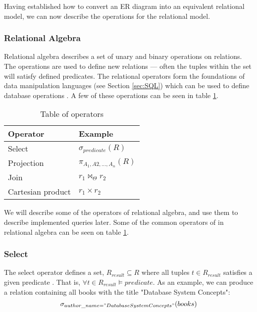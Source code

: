
Having established how to convert an ER diagram into an equivalent relational model, we can now describe the operations for the relational model.

\subsubsection{Relational Algebra}\label{sec:relationalAlgebra}
Relational algebra describes a set of unary and binary operations on relations.
The operations are used to define new relations --- often the tuples within the set will satisfy defined predicates.
The relational operators form the foundations of data manipulation languages (see Section \ref{sec:SQL}) which can be used to define database operations \cite{DBSBook}.
A few of these operations can be seen in table \ref{Relational algebra operators}.


\begin{table}[h]
    \centering
    \begin{tabular}{|ll|}
    \hline 
    \multicolumn{1}{|l|}{\textbf{Operator}}          & \multicolumn{1}{l|}{\textbf{Example}}   \\ \hline
    \multicolumn{1}{|l|}{Select}                     & \multicolumn{1}{l|}{$\sigma_{predicate}(R)$}            \\ \hline
    \multicolumn{1}{|l|}{Projection}                 & \multicolumn{1}{l|}{$\pi_{A_1, A2,...,A_n}(R)$}           \\ \hline
    \multicolumn{1}{|l|}{Join}                 & \multicolumn{1}{l|}{$r_1 \Join_\Theta r_2$}             \\ \hline
    \multicolumn{1}{|l|}{Cartesian product}          & \multicolumn{1}{l|}{$r_1\times r_2$}              \\ \hline
    \end{tabular}
    \caption{Table of operators}
    \label{Relational algebra operators}
\end{table}

We will describe some of the operators of relational algebra, and use them to describe implemented queries later.
Some of the common operators of in relational algebra can be seen on table \ref{Relational algebra operators}.
\subsubsection*{Select}
The select operator defines a set, $R_{result}\subseteq R$ where all tuples $t \in R_{result}$ satisfies a given predicate \cite{DBSBook}.
That is, $\forall t \in R_{result} \vDash predicate$.
As an example, we can produce a relation containing all books with the title "Database System Concepts":
$$\sigma_{author\_name = "Database System Concepts"}(books)$$
